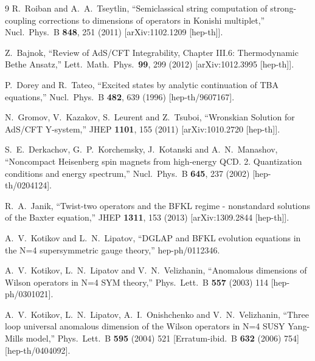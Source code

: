 \documentclass[a4paper,11pt]{article}
\numberwithin{equation}{section}
\begin{document}
\begin{thebibliography} {9}
  R.~Roiban and A.~A.~Tseytlin,
  ``Semiclassical string computation of strong-coupling corrections to dimensions of operators in Konishi multiplet,''
  Nucl.\ Phys.\ B {\bf 848}, 251 (2011)
  [arXiv:1102.1209 [hep-th]].

  Z.~Bajnok,
  ``Review of AdS/CFT Integrability, Chapter III.6: Thermodynamic Bethe Ansatz,''
  Lett.\ Math.\ Phys.\  {\bf 99}, 299 (2012)
  [arXiv:1012.3995 [hep-th]].

  P.~Dorey and R.~Tateo,
  ``Excited states by analytic continuation of TBA equations,''
  Nucl.\ Phys.\ B {\bf 482}, 639 (1996)
  [hep-th/9607167].

  N.~Gromov, V.~Kazakov, S.~Leurent and Z.~Tsuboi,
  ``Wronskian Solution for AdS/CFT Y-system,''
  JHEP {\bf 1101}, 155 (2011)
  [arXiv:1010.2720 [hep-th]].

  S.~E.~Derkachov, G.~P.~Korchemsky, J.~Kotanski and A.~N.~Manashov,
  ``Noncompact Heisenberg spin magnets from high-energy QCD. 2. Quantization conditions and energy spectrum,''
  Nucl.\ Phys.\ B {\bf 645}, 237 (2002)
  [hep-th/0204124].

  R.~A.~Janik,
  ``Twist-two operators and the BFKL regime - nonstandard solutions of the Baxter equation,''
  JHEP {\bf 1311}, 153 (2013)
  [arXiv:1309.2844 [hep-th]].

  A.~V.~Kotikov and L.~N.~Lipatov,
  ``DGLAP and BFKL evolution equations in the N=4 supersymmetric gauge theory,''
  hep-ph/0112346.

  A.~V.~Kotikov, L.~N.~Lipatov and V.~N.~Velizhanin,
  ``Anomalous dimensions of Wilson operators in N=4 SYM theory,''
  Phys.\ Lett.\ B {\bf 557} (2003) 114
  [hep-ph/0301021].

  A.~V.~Kotikov, L.~N.~Lipatov, A.~I.~Onishchenko and V.~N.~Velizhanin,
  ``Three loop universal anomalous dimension of the Wilson operators in N=4 SUSY Yang-Mills model,''
  Phys.\ Lett.\ B {\bf 595} (2004) 521
   [Erratum-ibid.\ B {\bf 632} (2006) 754]
  [hep-th/0404092].


\end{thebibliography}
\end{document}
